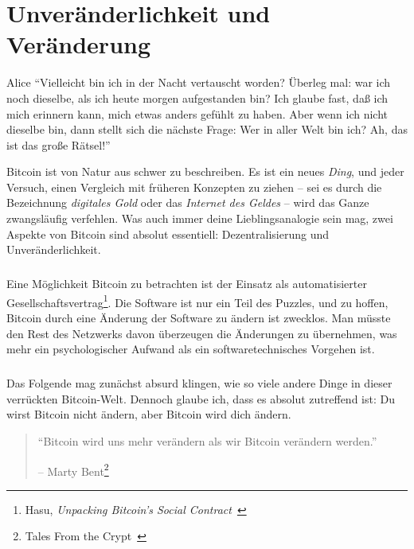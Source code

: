 \chapter{Unveränderlichkeit und Veränderung}
\label{les:1}

\begin{chapquote}{Alice}
\enquote{Vielleicht bin ich in der Nacht vertauscht worden? Überleg mal: war ich
noch dieselbe, als ich heute morgen aufgestanden bin? Ich glaube fast, daß ich
mich erinnern kann, mich etwas anders gefühlt zu haben. Aber wenn ich nicht
dieselbe bin, dann stellt sich die nächste Frage: Wer in aller Welt bin ich? Ah,
das ist das große Rätsel!}
\end{chapquote}

Bitcoin ist von Natur aus schwer zu beschreiben. Es ist ein neues \textit{Ding},
und jeder Versuch, einen Vergleich mit früheren Konzepten zu ziehen – sei es
durch die Bezeichnung \textit{digitales Gold} oder das \textit{Internet des
Geldes} – wird das Ganze zwangsläufig verfehlen. Was auch immer deine
Lieblingsanalogie sein mag, zwei Aspekte von Bitcoin sind absolut essentiell:
Dezentralisierung und Unveränderlichkeit.

\paragraph{}
Eine Möglichkeit Bitcoin zu betrachten ist der Einsatz als automatisierter
Gesellschaftsvertrag\footnote{Hasu, \textit{Unpacking Bitcoin's Social
Contract}~\cite{social-contract}}. Die Software ist nur ein Teil des Puzzles,
und zu hoffen, Bitcoin durch eine Änderung der Software zu ändern ist zwecklos.
Man müsste den Rest des Netzwerks davon überzeugen die Änderungen zu übernehmen,
was mehr ein psychologischer Aufwand als ein softwaretechnisches Vorgehen ist.

\paragraph{}
Das Folgende mag zunächst absurd klingen, wie so viele andere Dinge in dieser
verrückten Bitcoin-Welt. Dennoch glaube ich, dass es absolut zutreffend ist: Du
wirst Bitcoin nicht ändern, aber Bitcoin wird dich ändern.

\begin{quotation}\begin{samepage}
\enquote{Bitcoin wird uns mehr verändern als wir Bitcoin verändern werden.}
\begin{flushright} -- Marty Bent\footnote{Tales From the Crypt~\cite{tftc21}}
\end{flushright}\end{samepage}\end{quotation}

